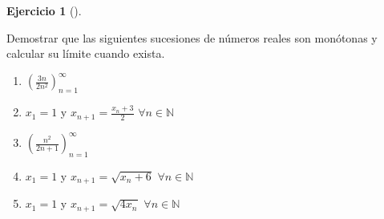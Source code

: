 \documentclass[
  a4paper,
]{scrreport}
\theoremstyle{definition}
\newtheorem{exercise}{Ejercicio}[chapter]
\theoremstyle{remark}
\begin{document}
\leavevmode{}%
\begin{exercise}[]\label{exr-sucesiones-monotonas}

Demostrar que las siguientes sucesiones de números reales son monótonas
y calcular su límite cuando exista.

\begin{enumerate}
\def\labelenumi{\alph{enumi}.}
\item
  \(\left(\frac{3n}{2n^2}\right)_{n=1}^\infty\)
\item
  \(x_1=1\) y \(x_{n+1}=\frac{x_n+3}{2}\) \(\forall n \in \mathbb{N}\)
\item
  \(\left(\frac{n^2}{2n+1}\right)_{n=1}^\infty\)
\item
  \(x_1=1\) y \(x_{n+1}=\sqrt{x_n+6}\) \(\forall n\in \mathbb{N}\)
\item
  \(x_1=1\) y \(x_{n+1}=\sqrt{4x_n}\) \(\forall n\in\mathbb{N}\)
\end{enumerate}

\end{exercise}
\end{document}
